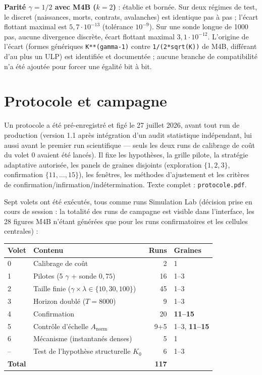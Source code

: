 \documentclass[11pt,a4paper]{article}
\newcommand{\code}[1]{\texttt{#1}}
\begin{document}
\textbf{Parité $\gamma=1/2$ avec M4B ($k=2$)} : établie et bornée.
Sur deux régimes de test, le discret (naissances, morts, contrats,
avalanches) est identique pas à pas ; l'écart flottant maximal est
$5{,}7\cdot10^{-13}$ (tolérance $10^{-9}$). Sur une sonde longue de 1000
pas, aucune divergence discrète, écart flottant maximal
$3{,}1\cdot10^{-12}$. L'origine de l'écart (formes génériques
\code{K**(gamma-1)} contre \code{1/(2*sqrt(K))} de M4B, différant d'au
plus un ULP) est identifiée et documentée ; aucune branche de
compatibilité n'a été ajoutée pour forcer une égalité bit à bit.

\section{Protocole et campagne}

Un protocole a été pré-enregistré et figé le 27 juillet 2026, avant tout
run de production (version 1.1 après intégration d'un audit statistique
indépendant, lui aussi avant le premier run scientifique --- seuls les
deux runs de calibrage de coût du volet 0 avaient été lancés). Il fixe
les hypothèses, la grille pilote, la stratégie adaptative autorisée, les
panels de graines disjoints (exploration $\{1,2,3\}$, confirmation
$\{11,\dots,15\}$), les fenêtres, les méthodes d'ajustement et les
critères de confirmation/infirmation/indétermination. Texte complet :
\code{protocole.pdf}.

Sept volets ont été exécutés, tous comme runs Simulation Lab (décision
prise en cours de session : la totalité des runs de campagne est
visible dans l'interface, les 28 figures M4B n'étant générées que pour
les runs confirmatoires et les cellules centrales) :

\begin{center}
\begin{tabular}{llrl}
\toprule
Volet & Contenu & Runs & Graines\\
\midrule
0 & Calibrage de coût & 2 & 1\\
1 & Pilotes (5 $\gamma$ + sonde $0{,}75$) & 16 & 1--3\\
2 & Taille finie ($\gamma\times\lambda\in\{10,30,100\}$) & 45 & 1--3\\
3 & Horizon doublé ($T=8000$) & 9 & 1--3\\
4 & Confirmation & 20 & \textbf{11--15}\\
5 & Contrôle d'échelle $A_{\mathrm{norm}}$ & 9+5 & 1--3, \textbf{11--15}\\
6 & Mécanisme (instantanés denses) & 5 & 1\\
-- & Test de l'hypothèse structurelle $K_0$ & 6 & 1--3\\
\midrule
\textbf{Total} & & \textbf{117} & \\
\bottomrule
\end{tabular}
\end{center}
\end{document}
